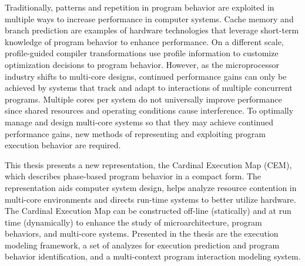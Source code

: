 
Traditionally, patterns and repetition in program behavior are
exploited in multiple ways to increase performance in computer
systems.  Cache memory and branch prediction are examples of hardware
technologies that leverage short-term knowledge of program behavior to
enhance performance.  On a different scale, profile-guided compiler
transformations use profile information to customize optimization
decisions to program behavior. However, as the microprocessor industry
shifts to multi-core designs, continued performance gains can only be
achieved by systems that track and adapt to interactions of multiple
concurrent programs.  Multiple cores per system do not universally
improve performance since shared resources and operating conditions
cause interference.  To optimally manage and design multi-core systems
so that they may achieve continued performance gains, new methods of
representing and exploiting program execution behavior are required.

This thesis presents a new representation, the Cardinal Execution Map
(CEM), which describes phase-based program behavior in a compact form.
The representation aids computer system design, helps analyze resource
contention in multi-core environments and directs run-time systems to
better utilize hardware.  The Cardinal Execution Map can be
constructed off-line (statically) and at run time (dynamically) to
enhance the study of microarchitecture, program behaviors, and
multi-core systems.  Presented in the thesis are the execution
modeling framework, a set of analyzes for execution prediction and
program behavior identification, and a multi-context program interaction
modeling system.

